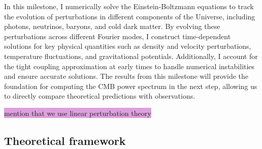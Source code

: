 \documentclass{aa}
\begin{document}
In this milestone, I numerically solve the Einstein-Boltzmann equations to track the evolution of perturbations in different components of the Universe, including photons, neutrinos, baryons, and cold dark matter. By evolving these perturbations across different Fourier modes, I construct time-dependent solutions for key physical quantities such as density and velocity perturbations, temperature fluctuations, and gravitational potentials. Additionally, I account for the tight coupling approximation at early times to handle numerical instabilities and ensure accurate solutions. The results from this milestone will provide the foundation for computing the CMB power spectrum in the next step, allowing us to directly compare theoretical predictions with observations.

\colorbox{Plum}{mention that we use linear perturbation theory}


\subsection{Theoretical framework}\label{subsec: III theory}
\end{document}
